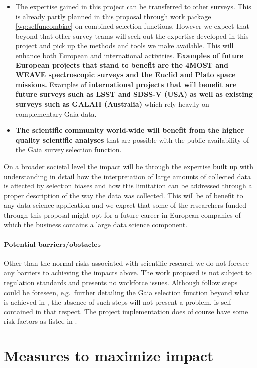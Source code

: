 \begin{itemize}
    \item The expertise gained in this project can be transferred to other surveys. This is already partly planned in this proposal through work package \ref{wp:selfuncombine} on combined selection functions. However we expect that beyond that other survey teams will seek out the expertise developed in this project and  pick up the methods and tools we make available. This will enhance both European and international activities. \textbf{Examples of future European projects that stand to benefit are the 4MOST and WEAVE spectroscopic surveys and the Euclid and Plato space missions.} Examples of \textbf{international projects that will benefit are future surveys such as LSST and SDSS-V (USA) as well as existing surveys such as GALAH (Australia)} which rely heavily on complementary Gaia data.
    \item \textbf{The scientific community world-wide will benefit from the higher quality scientific analyses} that are possible with the public availability of the Gaia survey selection function.
\end{itemize}

On a broader societal level the impact will be through the expertise built up with understanding in detail how the interpretation of large amounts of collected data is affected by selection biases and how this limitation can be addressed through a proper description of the way the data was collected. This will be of benefit to any data science application and we expect that some of the researchers funded through this proposal might opt for a future career in European companies of which the business contains a large data science component.

\paragraph{Potential barriers/obstacles} Other than the normal risks associated with scientific research we do not foresee any barriers to achieving the impacts above. The work proposed is not subject to regulation standards and presents no workforce issues. Although follow steps could be foreseen, e.g.\ further detailing the Gaia selection function beyond what is achieved in {\acro}, the absence of such steps will not present a problem. {\acro} is self-contained in that respect. The project implementation does of course have some risk factors as listed in .

\section{Measures to maximize impact} 
\label{sec:maximize-impact}

